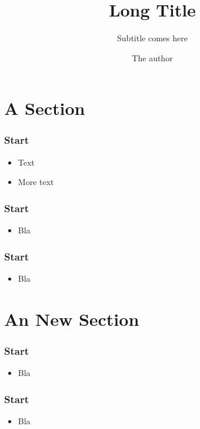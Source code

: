 \documentclass{beamer}
\title[Short Title]{Long Title}
\subtitle{Subtitle comes here}
\author{The author}
\institute{The Institute}
\date{}
\begin{document}
\maketitle



\section{A Section}

\begin{frame} 
\frametitle{Start}
\begin{itemize}
 \item Text
 \item More text
\end{itemize}
\end{frame}

\begin{frame} 
\frametitle{Start}
\begin{itemize}
 \item Bla
\end{itemize}
\end{frame}

\begin{frame} 
\frametitle{Start}
\begin{itemize}
 \item Bla
\end{itemize}
\end{frame}

\section{An New Section}
\begin{frame} 
\frametitle{Start}
\begin{itemize}
 \item Bla
\end{itemize}
\end{frame}

\begin{frame} 
\frametitle{Start}
\begin{itemize}
 \item Bla
\end{itemize}
\end{frame}
\end{document}
